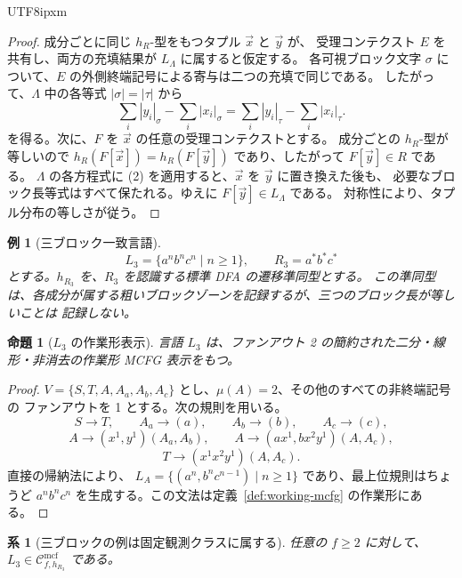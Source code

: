 \documentclass[10pt,a4paper]{article}
\newtheorem{proposition}[theorem]{命題}
\newtheorem{corollary}[theorem]{系}
\newtheorem{example}[theorem]{例}
\theoremstyle{remark}
\newcommand{\Cmcf}[2]{\mathcal{C}^{\mathrm{mcf}}_{#1,#2}}
\newcommand{\tuple}[1]{\vec{#1}}
\begin{document}
\begin{CJK}{UTF8}{ipxm}
\begin{proof}
成分ごとに同じ \(h_R\)-型をもつタプル \(\tuple x\) と \(\tuple y\) が、
受理コンテクスト \(E\) を共有し、両方の充填結果が \(L_\Lambda\) に属すると仮定する。
各可視ブロック文字 \(\sigma\) について、\(E\) の外側終端記号による寄与は二つの充填で同じである。
したがって、\(\Lambda\) 中の各等式 \(|\sigma|=|\tau|\) から
\[
  \sum_i |y_i|_\sigma-\sum_i |x_i|_\sigma
  =
  \sum_i |y_i|_\tau-\sum_i |x_i|_\tau .                  \tag{2}
\]
を得る。次に、\(F\) を \(\tuple x\) の任意の受理コンテクストとする。
成分ごとの \(h_R\)-型が等しいので
\(h_R(F[\tuple x])=h_R(F[\tuple y])\) であり、したがって \(F[\tuple y]\in R\) である。
\(\Lambda\) の各方程式に (2) を適用すると、\(\tuple x\) を \(\tuple y\) に置き換えた後も、
必要なブロック長等式はすべて保たれる。ゆえに \(F[\tuple y]\in L_\Lambda\) である。
対称性により、タプル分布の等しさが従う。
\end{proof}

\begin{example}[三ブロック一致言語]
\label{ex:l3-language}
\[
  L_3=\{a^n b^n c^n\mid n\ge1\},
  \qquad R_3=a^*b^*c^*
\]
とする。\(h_{R_3}\) を、\(R_3\) を認識する標準 DFA の遷移準同型とする。
この準同型は、各成分が属する粗いブロックゾーンを記録するが、三つのブロック長が等しいことは
記録しない。
\end{example}

\begin{proposition}[\(L_3\) の作業形表示]
\label{prop:l3-running-example}
言語 \(L_3\) は、ファンアウト 2 の簡約された二分・線形・非消去の作業形 MCFG 表示をもつ。
\end{proposition}

\begin{proof}
\(V=\{S,T,A,A_a,A_b,A_c\}\) とし、\(\mu(A)=2\)、その他のすべての非終端記号の
ファンアウトを 1 とする。次の規則を用いる。
\[
  S\to T,\qquad A_a\to(a),\qquad A_b\to(b),\qquad A_c\to(c),
\]
\[
  A\to(x^1,y^1)(A_a,A_b),\qquad
  A\to(a x^1,b x^2 y^1)(A,A_c),
\]
\[
  T\to(x^1x^2y^1)(A,A_c).
\]
直接の帰納法により、
\(L_A=\{(a^n,b^n c^{n-1})\mid n\ge1\}\) であり、最上位規則はちょうど
\(a^n b^n c^n\) を生成する。この文法は定義~\ref{def:working-mcfg} の作業形にある。
\end{proof}

\begin{corollary}[三ブロックの例は固定観測クラスに属する]
\label{cor:l3-in-fixed-observation-class}
任意の \(f\ge2\) に対して、\(L_3\in\Cmcf{f}{h_{R_3}}\) である。
\end{corollary}


\end{CJK}
\end{document}
